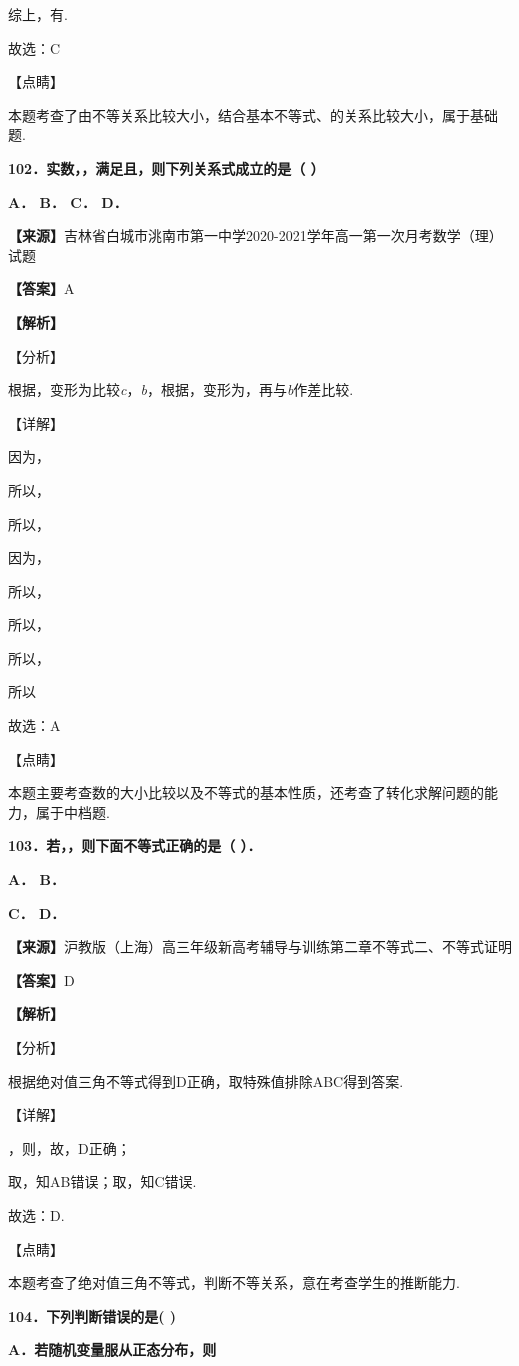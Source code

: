 \documentclass[
]{article}
\begin{document}
综上，有.

故选：C

【点睛】

本题考查了由不等关系比较大小，结合基本不等式、的关系比较大小，属于基础题.

\textbf{102．实数，，满足且，则下列关系式成立的是（ ）}

\textbf{A． B． C． D．}

\textbf{【来源】}吉林省白城市洮南市第一中学2020-2021学年高一第一次月考数学（理）试题

\textbf{【答案】}A

\textbf{【解析】}

【分析】

根据，变形为比较\emph{c}，\emph{b}，根据，变形为，再与\emph{b}作差比较.

【详解】

因为，

所以，

所以，

因为，

所以，

所以，

所以，

所以

故选：A

【点睛】

本题主要考查数的大小比较以及不等式的基本性质，还考查了转化求解问题的能力，属于中档题.

\textbf{103．若，，则下面不等式正确的是（ ）．}

\textbf{A． B．}

\textbf{C． D．}

\textbf{【来源】}沪教版（上海）高三年级新高考辅导与训练第二章不等式二、不等式证明

\textbf{【答案】}D

\textbf{【解析】}

【分析】

根据绝对值三角不等式得到D正确，取特殊值排除ABC得到答案.

【详解】

，则，故，D正确；

取，知AB错误；取，知C错误.

故选：D.

【点睛】

本题考查了绝对值三角不等式，判断不等关系，意在考查学生的推断能力.

\textbf{104．下列判断错误的是( )}

\textbf{A．若随机变量服从正态分布，则}
\end{document}
